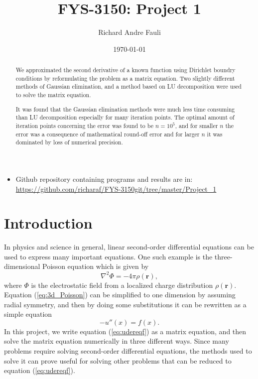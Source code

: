 \documentclass[norsk,a4paper,12pt]{article}
\title{FYS-3150: Project 1}
\author{Richard Andre Fauli}
\date{\today}
\begin{document}
\maketitle

\begin{abstract}
We approximated the second derivative of a known function using Dirichlet boundry conditions by reformulating the problem as a matrix equation. Two slightly different methods of Gaussian elimination, and a method based on LU decomposition were used to solve the matrix equation. 

It was found that the Gaussian elimination methods were much less time consuming than LU decomposition especially for many iteration points. The optimal amount of iteration points concerning the error was found to be $n=10^5$, and for smaller $n$ the error was a consequence of mathematical round-off error and for larger $n$ it was dominated by loss of numerical precision.
\end{abstract}
\begin{itemize}
\item Github repository containing programs and results are in: \url{https://github.com/richaraf/FYS-3150git/tree/master/Project_1}
\end{itemize}
\section{Introduction}
In physics and science in general, linear second-order differential equations can be used to express many important equations. One such example is the three-dimensional Poisson equation which is given by
\begin{equation}
\nabla ^2 \Phi = - 4\pi \rho (\textbf{r}),
\label{eq:3d_Poisson}
\end{equation}
where $\Phi$ is the electrostatic field from a localized charge distribution $\rho(\textbf{r})$. Equation (\ref{eq:3d_Poisson}) can be simplified to one dimension by assuming radial symmetry, and then by doing some substitutions it can be rewritten as a simple equation
\begin{equation}
-u''(x) = f(x).
\label{eq:udereqf}
\end{equation}
In this project, we write equation (\ref{eq:udereqf}) as a matrix equation, and then solve the matrix equation numerically in three different ways. Since many problems require solving second-order differential equations, the methods used to solve it can prove useful for solving other problems that can be reduced to equation (\ref{eq:udereqf}).
\end{document}
